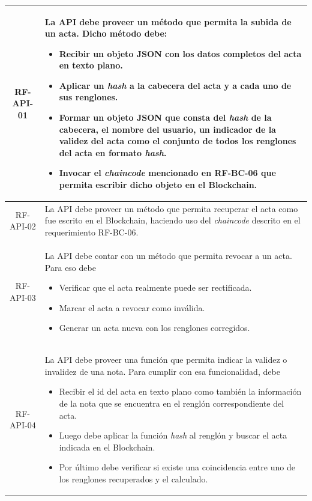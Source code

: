 \begin{table}
    \begin{tabularx}{\textwidth}{|c|X|}
    \hline
    RF-API-01 & La API debe proveer un método que permita la subida de un acta. Dicho método debe:
    \begin{itemize}
        \item Recibir un objeto JSON con los datos completos del acta en texto plano.
        \item Aplicar un \textit{hash} a la cabecera del acta y a cada uno de sus renglones.
        \item Formar un objeto JSON que consta del \textit{hash} de la cabecera, el nombre del usuario, un indicador de la validez del acta como el conjunto de todos los renglones del acta en formato \textit{hash}.
        \item Invocar el \textit{chaincode} mencionado en RF-BC-06 que permita escribir dicho objeto en el Blockchain.
    \end{itemize}\\
    \hline
    RF-API-02 & La API debe proveer un método que permita recuperar el acta como fue escrito en el Blockchain, haciendo uso del \textit{chaincode} descrito en el requerimiento RF-BC-06.\\
    \hline
    RF-API-03 & La API debe contar con un método que permita revocar a un acta. Para eso debe
    \begin{itemize}
        \item Verificar que el acta realmente puede ser rectificada.
        \item Marcar el acta a revocar como inválida.
        \item Generar un acta nueva con los renglones corregidos.
    \end{itemize}\\
    \hline
    RF-API-04 & La API debe proveer una función que permita indicar la validez o invalidez de una nota. Para cumplir con esa funcionalidad, debe
    \begin{itemize}
        \item Recibir el id del acta en texto plano como también la información de la nota que se encuentra en el renglón correspondiente del acta.
        \item Luego debe aplicar la función \textit{hash} al renglón y buscar el acta indicada en el Blockchain.
        \item Por último debe verificar si existe una coincidencia entre uno de los renglones recuperados y el calculado.

\end{itemize}
\end{tabularx}
\end{table}
